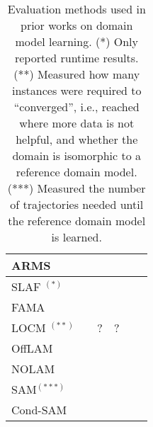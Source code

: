 \documentclass{article}
\newcommand{\cmark}{\ding{51}} %
\newcommand{\xmark}{\ding{55}} %
\newcommand{\smallcite}[1]{\begingroup\scriptsize\citep{#1}\endgroup}
\theoremstyle{definition}
\theoremstyle{remark}
\newcommand{\sam}{\ac{SAM}\xspace}
\begin{document}
\begin{table}[bt]
{\begin{tabular}{p{3.7cm}|c|c|c|c|c}
ARMS \smallcite{yang2007learning} & \cmark & \xmark & \xmark & \xmark & \xmark  \\
\midrule
SLAF 
\smallcite{amir2008learning}$^{(*)}$& \xmark & \xmark & \xmark & \xmark & \xmark  \\
\midrule
FAMA 
\smallcite{aineto2019learning} & \cmark & \cmark & \cmark & \xmark & \xmark  \\
\midrule
LOCM \smallcite{cresswell2013acquiring}$^{(**)}$ & \xmark & ? & ? & \xmark & \xmark  \\
\midrule
OffLAM \smallcite{LAMANNA2025104256} & \cmark & \xmark & \xmark & \cmark & \cmark  \\
\midrule
NOLAM \smallcite{Lamanna24} & \cmark & \xmark & \xmark & \cmark & \cmark  \\
\midrule
\sam \smallcite{juba2021safe}$^{(***)}$ & \cmark & \xmark & \xmark & \xmark & \xmark  \\
\midrule
Cond-SAM \smallcite{mordoch2024safe} & \cmark & \xmark & \xmark & \cmark & \xmark  \\ %
\bottomrule
\end{tabular}
}
\caption{Evaluation methods used in prior works on domain model learning. 
(*) Only reported runtime results. (**) Measured how many instances were required to ``converged'', i.e., reached where more data is not helpful, and whether the domain is isomorphic to a reference domain model. (***) Measured the number of trajectories needed until the reference domain model is learned.}
\label{tab:metric-using-comparison}
\end{table}



\end{document}
